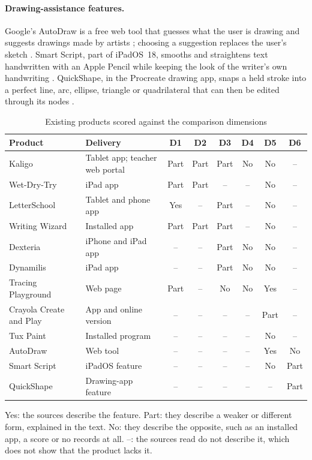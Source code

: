 \documentclass[12pt]{article}
\renewcommand{\_}{\textunderscore\allowbreak}%
\begin{document}
\paragraph{Drawing-assistance features.}
Google's AutoDraw is a free web tool that guesses what the user is drawing and
suggests drawings made by artists \citep{Motzenbecker2017AutoDraw}; choosing a
suggestion replaces the user's sketch \citep{Lardinois2017AutoDraw}. Smart
Script, part of iPadOS~18, smooths and straightens text handwritten with an
Apple Pencil while keeping the look of the writer's own handwriting
\citep{Apple2024SmartScript}. QuickShape, in the Procreate drawing app, snaps a
held stroke into a perfect line, arc, ellipse, triangle or quadrilateral that
can then be edited through its nodes \citep{Procreate2026QuickShape}.

\begin{table}[H]
\centering
\footnotesize
\caption{Existing products scored against the comparison dimensions}
\label{tab:ots-matrix}
\setlength{\tabcolsep}{4pt}
\begin{tabularx}{\textwidth}{@{}>{\raggedright\arraybackslash}p{}%
>{\raggedright\arraybackslash}Xcccccc@{}}
\toprule
\textbf{Product} & \textbf{Delivery} & \textbf{D1} & \textbf{D2} & \textbf{D3} &
\textbf{D4} & \textbf{D5} & \textbf{D6} \\
\midrule
Kaligo & Tablet app; teacher web portal & Part & Part & Part & No & No & -- \\
Wet-Dry-Try & iPad app & Part & Part & -- & -- & No & -- \\
LetterSchool & Tablet and phone app & Yes & -- & Part & -- & No & -- \\
Writing Wizard & Installed app & Part & Part & Part & -- & No & -- \\
Dexteria & iPhone and iPad app & -- & -- & Part & No & No & -- \\
Dynamilis & iPad app & -- & -- & Part & No & No & -- \\
Tracing Playground & Web page & Part & -- & No & No & Yes & -- \\
Crayola Create and Play & App and online version & -- & -- & -- & -- & Part & --
\\
Tux Paint & Installed program & -- & -- & -- & -- & No & -- \\
AutoDraw & Web tool & -- & -- & -- & -- & Yes & No \\
Smart Script & iPadOS feature & -- & -- & -- & -- & No & Part \\
QuickShape & Drawing-app feature & -- & -- & -- & -- & -- & Part \\
\bottomrule
\end{tabularx}

\smallskip
\begin{minipage}{\textwidth}
\raggedright
Yes: the sources describe the feature. Part: they describe a weaker or different
form, explained in the text. No: they describe the opposite, such as an
installed app, a score or no records at all. --: the sources read do not
describe it, which does not show that the product lacks it.
\end{minipage}
\end{table}
\end{document}
